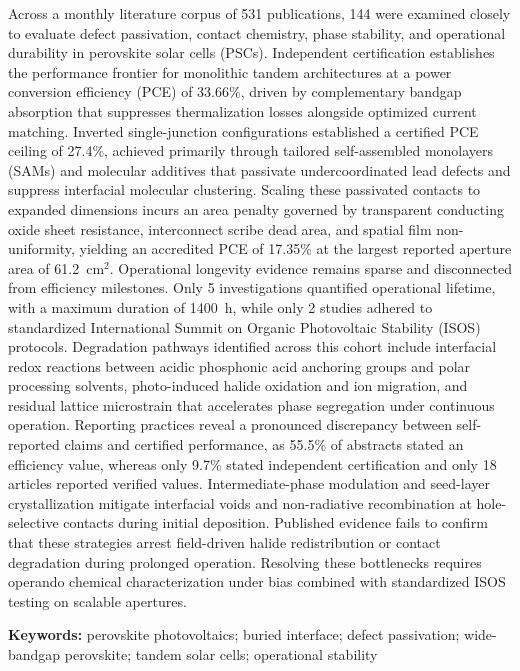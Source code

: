 \documentclass[
  11pt,
]{article}
\begin{document}
Across a monthly literature corpus of 531 publications, 144 were
examined closely to evaluate defect passivation, contact chemistry,
phase stability, and operational durability in perovskite solar cells
(PSCs). Independent certification establishes the performance frontier
for monolithic tandem architectures at a power conversion efficiency
(PCE) of 33.66\%, driven by complementary bandgap absorption that
suppresses thermalization losses alongside optimized current matching.
Inverted single-junction configurations established a certified PCE
ceiling of 27.4\%, achieved primarily through tailored self-assembled
monolayers (SAMs) and molecular additives that passivate
undercoordinated lead defects and suppress interfacial molecular
clustering. Scaling these passivated contacts to expanded dimensions
incurs an area penalty governed by transparent conducting oxide sheet
resistance, interconnect scribe dead area, and spatial film
non-uniformity, yielding an accredited PCE of 17.35\% at the largest
reported aperture area of \qty{61.2}{\centi\meter}\(^2\). Operational
longevity evidence remains sparse and disconnected from efficiency
milestones. Only 5 investigations quantified operational lifetime, with
a maximum duration of \qty{1400}{\hour}, while only 2 studies adhered to
standardized International Summit on Organic Photovoltaic Stability
(ISOS) protocols. Degradation pathways identified across this cohort
include interfacial redox reactions between acidic phosphonic acid
anchoring groups and polar processing solvents, photo-induced halide
oxidation and ion migration, and residual lattice microstrain that
accelerates phase segregation under continuous operation. Reporting
practices reveal a pronounced discrepancy between self-reported claims
and certified performance, as 55.5\% of abstracts stated an efficiency
value, whereas only 9.7\% stated independent certification and only 18
articles reported verified values. Intermediate-phase modulation and
seed-layer crystallization mitigate interfacial voids and non-radiative
recombination at hole-selective contacts during initial deposition.
Published evidence fails to confirm that these strategies arrest
field-driven halide redistribution or contact degradation during
prolonged operation. Resolving these bottlenecks requires operando
chemical characterization under bias combined with standardized ISOS
testing on scalable apertures.

\textbf{Keywords:} perovskite photovoltaics; buried interface; defect
passivation; wide-bandgap perovskite; tandem solar cells; operational
stability
\end{document}
